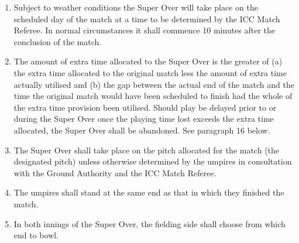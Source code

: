 \documentclass[12pt]{article}
\begin{document}
\vspace{\baselineskip}
\begin{enumerate}[label*={\fontsize{9pt}{9pt}\selectfont \arabic*.}]
	\item {\fontsize{9pt}{10.8pt}\selectfont Subject to weather conditions the Super Over will take place on the scheduled day of the match at a time to be determined by the ICC Match Referee. In normal circumstances it shall commence 10 minutes after the conclusion of the match.\par}\par


\vspace{\baselineskip}
	\item {\fontsize{9pt}{10.8pt}\selectfont The amount of extra time allocated to the Super Over is the greater of (a) the extra time allocated to the original match less the amount of extra time actually utilised and (b) the gap between the actual end of the match and the time the original match would have been scheduled to finish had the whole of the extra time provision been utilised. Should play be delayed prior to or during the Super Over once the playing time lost exceeds the extra time allocated, the Super Over shall be abandoned. See paragraph 16 below.\par}\par


\vspace{\baselineskip}
	\item {\fontsize{9pt}{10.8pt}\selectfont The Super Over shall take place on the pitch allocated for the match (the designated pitch) unless otherwise determined by the umpires in consultation with the Ground Authority and the ICC Match Referee.\par}\par


\vspace{\baselineskip}
	\item {\fontsize{9pt}{10.8pt}\selectfont The umpires shall stand at the same end as that in which they finished the match.\par}\par


\vspace{\baselineskip}
	\item {\fontsize{9pt}{10.8pt}\selectfont In both innings of the Super Over, the fielding side shall choose from which end to bowl.\par}\par



\end{enumerate}
\end{document}
